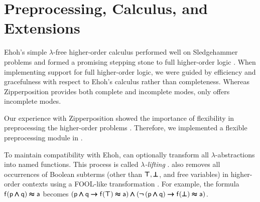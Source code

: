 



\section{Preprocessing, Calculus, and Extensions}

\label{sec:calculus}

Ehoh's simple $\lambda$-free higher-order calculus performed well on
Sledgehammer problems and formed a promising stepping stone to full higher-order
logic \cite{section-ehoh}. When implementing support for full higher-order
logic, we were guided by efficiency and gracefulness with respect to Ehoh's calculus rather
than completeness. Whereas Zipperposition provides both complete and incomplete
modes, \ehohii{} only offers incomplete modes.

 Our experience with Zipperposition showed the importance
of flexibility in preprocessing the higher-order problems
\cite{section-making-ho-work}. Therefore, we implemented a flexible
preprocessing module in \ehohii{}. 

To maintain compatibility with Ehoh, \ehohii{} can optionally transform all
$\lambda$-abstractions into named functions. This process is called
\emph{$\lambda$-lifting} \cite{rjmh-82-lifting}. \ehohii{} also removes all
occurrences of Boolean subterms (other than $\pmb\top, \pmb\bot$, and free variables)
in higher-order contexts using a FOOL-like transformation \cite{kotelnikov-16-fool}.
For example, the formula $\mathsf{f}(\mathsf{p} \pmb\land \mathsf{q}) \pmb\approx \mathsf{a}$ becomes
$(\mathsf{p} \pmb\land \mathsf{q} \pmb\rightarrow \mathsf{f}(\pmb\top) \pmb\approx \mathsf{a}) \pmb\land
(\pmb{\neg\,}(\mathsf{p} \pmb\land \mathsf{q}) \pmb\rightarrow \mathsf{f}(\pmb\bot) \pmb\approx \mathsf{a})$.

